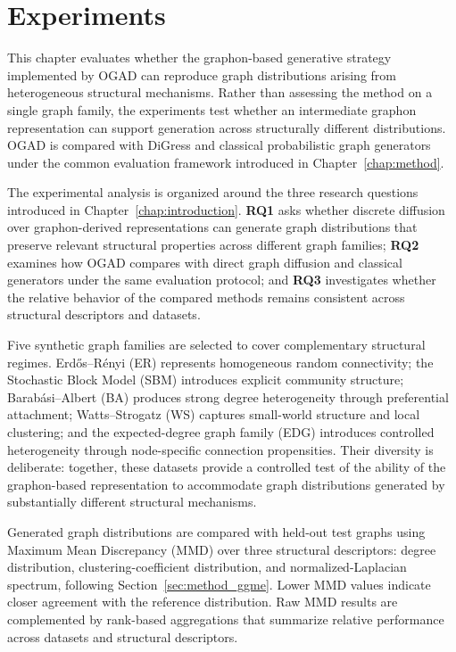\chapter{Experiments}
\label{chap:experiments}

This chapter evaluates whether the graphon-based generative strategy implemented by OGAD can reproduce graph distributions arising from heterogeneous structural mechanisms. Rather than assessing the method on a single graph family, the experiments test whether an intermediate graphon representation can support generation across structurally different distributions. OGAD is compared with DiGress and classical probabilistic graph generators under the common evaluation framework introduced in Chapter~\ref{chap:method}.

The experimental analysis is organized around the three research questions introduced in Chapter~\ref{chap:introduction}. \textbf{RQ1} asks whether discrete diffusion over graphon-derived representations can generate graph distributions that preserve relevant structural properties across different graph families; \textbf{RQ2} examines how OGAD compares with direct graph diffusion and classical generators under the same evaluation protocol; and \textbf{RQ3} investigates whether the relative behavior of the compared methods remains consistent across structural descriptors and datasets.

Five synthetic graph families are selected to cover complementary structural regimes. Erd\H{o}s--R\'enyi (ER) represents homogeneous random connectivity; the Stochastic Block Model (SBM) introduces explicit community structure; Barab\'asi--Albert (BA) produces strong degree heterogeneity through preferential attachment; Watts--Strogatz (WS) captures small-world structure and local clustering; and the expected-degree graph family (EDG) introduces controlled heterogeneity through node-specific connection propensities. Their diversity is deliberate: together, these datasets provide a controlled test of the ability of the graphon-based representation to accommodate graph distributions generated by substantially different structural mechanisms.

Generated graph distributions are compared with held-out test graphs using Maximum Mean Discrepancy (MMD) over three structural descriptors: degree distribution, clustering-coefficient distribution, and normalized-Laplacian spectrum, following Section~\ref{sec:method_ggme}. Lower MMD values indicate closer agreement with the reference distribution. Raw MMD results are complemented by rank-based aggregations that summarize relative performance across datasets and structural descriptors.

